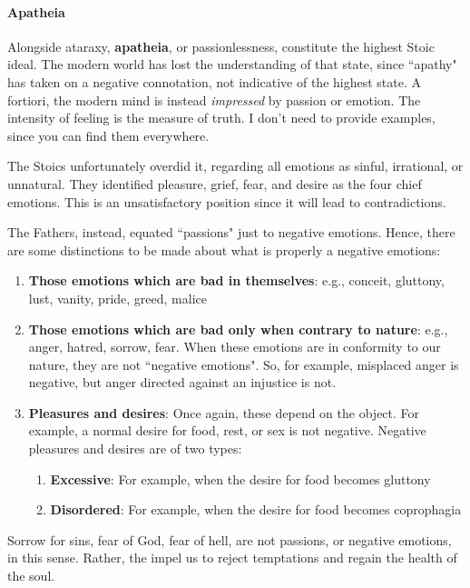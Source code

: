 \paragraph{Apatheia}
Alongside ataraxy, \textbf{apatheia}, or passionlessness, constitute the highest Stoic ideal. The modern world has lost the understanding of that state, since ``apathy" has taken on a negative connotation, not indicative of the highest state. A fortiori, the modern mind is instead \emph{impressed} by passion or emotion. The intensity of feeling is the measure of truth. I don't need to provide examples, since you can find them everywhere.

The Stoics unfortunately overdid it, regarding all emotions as sinful, irrational, or unnatural. They identified pleasure, grief, fear, and desire as the four chief emotions. This is an unsatisfactory position since it will lead to contradictions.

The Fathers, instead, equated ``passions" just to negative emotions. Hence, there are some distinctions to be made about what is properly a negative emotions:

\begin{enumerate}
\item \textbf{Those emotions which are bad in themselves}: e.g., conceit, gluttony, lust, vanity, pride, greed, malice 
\item \textbf{Those emotions which are bad only when contrary to nature}: e.g., anger, hatred, sorrow, fear. When these emotions are in conformity to our nature, they are not ``negative emotions". So, for example, misplaced anger is negative, but anger directed against an injustice is not. 
\item \textbf{Pleasures and desires}: Once again, these depend on the object. For example, a normal desire for food, rest, or sex is not negative. Negative pleasures and desires are of two types: 

\begin{enumerate}
\item \textbf{Excessive}: For example, when the desire for food becomes gluttony 
\item \textbf{Disordered}: For example, when the desire for food becomes coprophagia 
\end{enumerate}
\end{enumerate}
Sorrow for sins, fear of God, fear of hell, are not passions, or negative emotions, in this sense. Rather, the impel us to reject temptations and regain the health of the soul.

